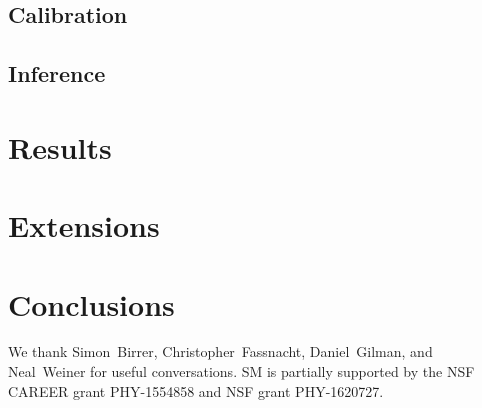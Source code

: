 \documentclass[twocolumn]{aastex62}
\begin{document}
\subsection{Calibration}
\label{sec:lfi-calibration}


\subsection{Inference}
\label{sec:lfi-inference}



\section{Results}
\label{sec:results}




\section{Extensions}
\label{sec:extensions}

\section{Conclusions}
\label{sec:conclusions}

\acknowledgements
We thank Simon~Birrer, Christopher~Fassnacht, Daniel~Gilman, and Neal~Weiner for useful conversations. SM is partially supported by the NSF CAREER grant PHY-1554858 and NSF grant PHY-1620727.




\end{document}
